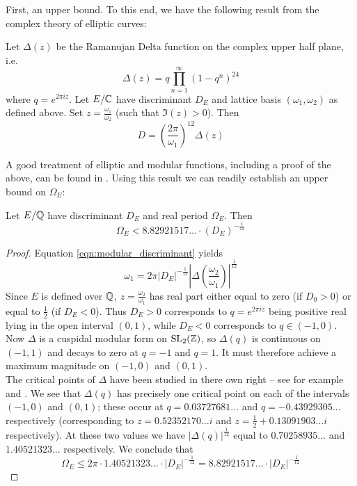 First, an upper bound. To this end, we have the following result from the complex theory of elliptic curves:
\begin{proposition}
Let $\Delta(z)$ be the Ramanujan Delta function on the complex upper half plane, i.e.
\begin{equation}
\Delta(z) = q \prod_{n=1}^{\infty} (1-q^n)^{24}
\end{equation}
where $q = e^{2\pi i z}$. Let $E/\mathbb{C}$ have discriminant $D_E$ and lattice basis $(\omega_1,\omega_2)$ as defined above. Set $z = \frac{\omega_1}{\omega_2}$ (such that $\Im(z) > 0$). Then
\begin{equation}\label{eqn:modular_discriminant}
D = \left(\frac{2\pi}{\omega_1}\right)^{12} \Delta\left(z \right)
\end{equation}
\end{proposition}
A good treatment of elliptic and modular functions, including a proof of the above, can be found in \cite{Sil-1994}. Using this result we can readily establish an upper bound on $\Omega_E$:
\begin{proposition}\label{prop:real_period_upper_bound_discriminant}
Let $E/\mathbb{Q}$ have discriminant $D_E$ and real period $\Omega_E$. Then
\begin{equation}\label{eqn:real_period_upper_bound_discriminant}
\Omega_E < 8.82921517\ldots \cdot (D_E)^{-\frac{1}{12}}
\end{equation}
\end{proposition}
\begin{proof}
Equation \ref{eqn:modular_discriminant} yields
\begin{equation}
\omega_1 = 2\pi |D_E|^{-\frac{1}{12}} \left| \Delta\left(\frac{\omega_2}{\omega_1}\right)\right|^{\frac{1}{12}}
\end{equation}
Since $E$ is defined over $\mathbb{Q}$, $z = \frac{\omega_2}{\omega_1}$ has real part either equal to zero (if $D_0>0$) or equal to $\frac{1}{2}$ (if $D_E<0$). Thus $D_E>0$ corresponds to $q = e^{2\pi i z}$ being positive real lying in the open interval $(0,1)$, while $D_E<0$ corresponds to $q \in (-1,0)$. Now $\Delta$ is a cuspidal modular form on $\operatorname{SL}_2(\mathbb{Z})$, so $\Delta(q)$ is continuous on $(-1,1)$ and decays to zero at $q=-1$ and $q=1$. It must therefore achieve a maximum magnitude on $(-1,0)$ and $(0,1)$. \\

The critical points of $\Delta$ have been studied in there own right -- see for example \cite{IJA-2013} and \cite{WoYo-2013}. We see that $\Delta(q)$ has precisely one critical point on each of the intervals $(-1,0)$ and $(0,1)$; these occur at $q = 0.03727681\ldots$ and $q =-0.43929305\ldots$ respectively (corresponding to $z=0.52352170\ldots i$ and $z=\frac{1}{2}+0.13091903\ldots i$ respectively). At these two values we have $|\Delta(q)|^{\frac{1}{12}}$ equal to $0.70258935\ldots$ and $1.40521323\ldots$ respectively. We conclude that
\begin{equation}
\Omega_E \le 2\pi\cdot 1.40521323\ldots \cdot  |D_E|^{-\frac{1}{12}} = 8.82921517\ldots \cdot |D_E|^{-\frac{1}{12}}
\end{equation} 
\end{proof}


